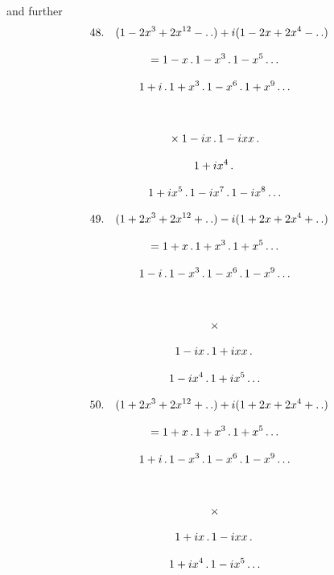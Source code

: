 \begingroup
\renewcommand{\arraystretch}{1.45}
\par {}



and further
\[
\begin{gathered}
48.\quad{}
(1-2x^3+2x^{12}- .\,. )+i(1-2x+2x^4- .\,. )\\[8pt]
\quad=1-x\,.\,1-x^3\,.\,1-x^5\mathinner{.\,.\,.} \\[8pt]\quad{}1+i\,.\,1+x^3\,.\,1-x^6\,.\,1+x^9\mathinner{.\,.\,.}\\[8pt]
\qquad\\[8pt]\quad{}\times1-ix\,.\,1-ixx\,.\,\\[8pt]\quad{}1+ix^4\,.\,\\[8pt]\quad{}1+ix^5\,.\,1-ix^7\,.\,1-ix^8\mathinner{.\,.\,.}
\end{gathered}
\]

\[
\begin{gathered}
49.\quad{}
(1+2x^3+2x^{12}+ .\,. )-i(1+2x+2x^4+ .\,. )\\[8pt]
\quad=1+x\,.\,1+x^3\,.\,1+x^5\mathinner{.\,.\,.} \\[8pt]\quad{}1-i\,.\,1-x^3\,.\,1-x^6\,.\,1-x^9\mathinner{.\,.\,.}\\[8pt]
\qquad\\[8pt]\quad{}\times\\[8pt]\quad{}1-ix\,.\,1+ixx\,.\,\\[8pt]\quad{}1-ix^4\,.\,1+ix^5\mathinner{.\,.\,.}
\end{gathered}
\]

\[
\begin{gathered}
50.\quad{}
(1+2x^3+2x^{12}+ .\,. )+i(1+2x+2x^4+ .\,. )\\[8pt]
\quad=1+x\,.\,1+x^3\,.\,1+x^5\mathinner{.\,.\,.} \\[8pt]\quad{}1+i\,.\,1-x^3\,.\,1-x^6\,.\,1-x^9\mathinner{.\,.\,.}\\[8pt]
\qquad\\[8pt]\quad{}\times\\[8pt]\quad{}1+ix\,.\,1-ixx\,.\,\\[8pt]\quad{}1+ix^4\,.\,1-ix^5\mathinner{.\,.\,.}
\end{gathered}
\]


